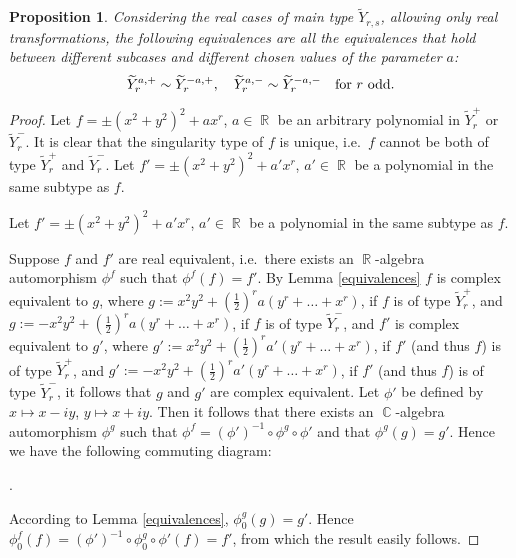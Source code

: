 \documentclass[noend]{amsproc}
\newtheorem{prop}[theorem]{Proposition}
\theoremstyle{definition}
\DeclareMathOperator{\R}{\mathbb{R}}
\DeclareMathOperator{\C}{\mathbb{C}}
\begin{document}
\begin{prop}
Considering the real cases of main type $\widetilde Y_{r,s}$, allowing only real transformations, the following equivalences are all the equivalences that hold between different subcases and different chosen values of the parameter $a$:
\[\widetilde Y_{r}^{a,+}\sim\widetilde Y_{r}^{-a,+}, \quad\widetilde Y_{r}^{a,-}\sim\widetilde Y_{r}^{-a,-}\quad\textnormal{for $r$ odd}.\]
\end{prop}
\begin{proof}
Let $f=\pm(x^2+y^2)^2+ax^r$, $a\in\R$ be an arbitrary polynomial in $\widetilde Y_{r}^+$ or $\widetilde Y_{r}^-$. It is clear that the singularity type of $f$ is unique, i.e.~$f$ cannot be both of type $\widetilde Y_{r}^+$ and $\widetilde Y_{r}^-$. Let $f'=\pm(x^2+y^2)^2+a'x^r$, $a'\in\R$ be a polynomial in the same subtype as $f$.

Let $f'=\pm(x^2+y^2)^2+a'x^r$, $a'\in\R$ be a polynomial in the same subtype as $f$.

Suppose $f$ and $f'$ are real equivalent, i.e.~there exists an $\R$-algebra automorphism $\phi^f$ such that $\phi^f(f)=f'$. 
By Lemma \ref{equivalences} $f$ is complex equivalent to $g$, where $g:=x^2y^2+(\frac{1}{2})^ra(y^r+\ldots+x^r)$, if $f$ is of type $\widetilde Y_r^+$, and $g:=-x^2y^2+(\frac{1}{2})^ra(y^r+\ldots+x^r)$, if $f$ is of type $\widetilde Y_r^-$, and $f'$ is complex equivalent to $g'$, where $g':= x^2y^2+(\frac{1}{2})^ra'(y^r+\ldots+x^r)$, if $f'$ (and thus $f$) is of type $\widetilde Y_r^+$, and $g':=-x^2y^2+(\frac{1}{2})^ra'(y^r+\ldots+x^r)$, if $f'$ (and thus $f$) is of type $\widetilde Y_r^-$, it follows that $g$ and $g'$ are complex equivalent. Let $\phi'$ be defined by $x\mapsto x-iy$, $y\mapsto x+iy$. Then it follows that there exists an $\C$-algebra automorphism $\phi^g$ such that $\phi^f=(\phi')^{-1}\circ\phi^g\circ\phi'$ and that $\phi^g(g)=g'$.  Hence we have the following commuting diagram:

\begin{center}
.
\end{center}
According to Lemma \ref{equivalences}, $\phi^g_0(g)=g'$. Hence $\phi^f_0(f)=(\phi')^{-1}\circ\phi_0^g\circ\phi'(f)=f'$, from which the result easily follows.
\end{proof}
\end{document}
